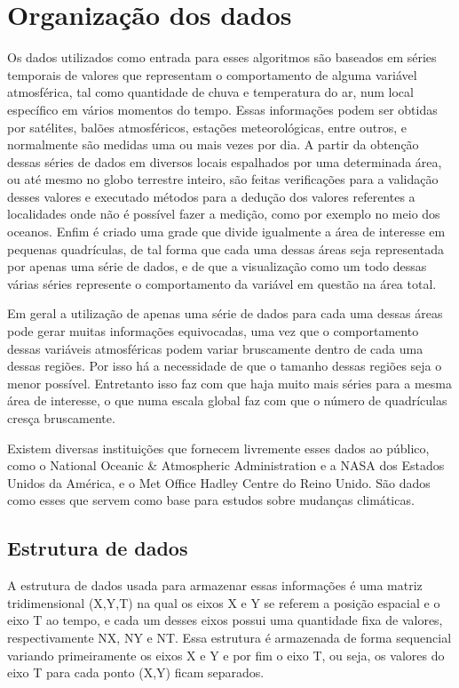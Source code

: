 \chapter{Organização dos dados}

Os dados utilizados como entrada para esses algoritmos são baseados em séries temporais de valores que representam o comportamento de alguma variável atmosférica, tal como quantidade de chuva e temperatura do ar, num local específico em vários momentos do tempo. Essas informações podem ser obtidas por satélites, balões atmosféricos, estações meteorológicas, entre outros, e normalmente são medidas uma ou mais vezes por dia. A partir da obtenção dessas séries de dados em diversos locais espalhados por uma determinada área, ou até mesmo no globo terrestre inteiro, são feitas verificações para a validação desses valores e executado métodos para a dedução dos valores referentes a localidades onde não é possível fazer a medição, como por exemplo no meio dos oceanos. Enfim é criado uma grade que divide igualmente a área de interesse em pequenas quadrículas, de tal forma que cada uma dessas áreas seja representada por apenas uma série de dados, e de que a visualização como um todo dessas várias séries represente o comportamento da variável em questão na área total. 

Em geral a utilização de apenas uma série de dados para cada uma dessas áreas pode gerar muitas informações equivocadas, uma vez que o comportamento dessas variáveis atmosféricas podem variar bruscamente dentro de cada uma dessas regiões. Por isso há a necessidade de que o tamanho dessas regiões seja o menor possível. Entretanto isso faz com que haja muito mais séries para a mesma área de interesse, o que numa escala global faz com que o número de quadrículas cresça bruscamente.

Existem diversas instituições que fornecem livremente esses dados ao público, como o National Oceanic \& Atmospheric Administration \cite{NOAA} e a NASA \cite{NASA} dos Estados Unidos da América, e o Met Office Hadley Centre \cite{MOHC} do Reino Unido. São dados como esses que servem como base para estudos sobre mudanças climáticas.

\section{Estrutura de dados}

A estrutura de dados usada para armazenar essas informações é uma matriz tridimensional (X,Y,T) na qual os eixos X e Y se referem a posição espacial e o eixo T ao tempo, e cada um desses eixos possui uma quantidade fixa de valores, respectivamente NX, NY e NT. Essa estrutura é armazenada de forma sequencial variando primeiramente os eixos X e Y e por fim o eixo T, ou seja, os valores do eixo T para cada ponto (X,Y) ficam separados.

